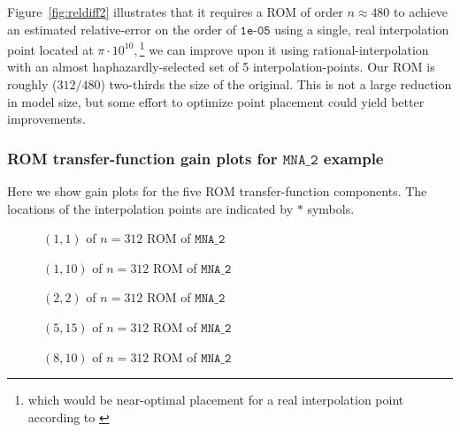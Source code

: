 Figure~\ref{fig:reldiff2} illustrates that it requires a ROM of order $n\approx480$ to achieve an estimated relative-error on the order of $\texttt{1e-05}$ using a single, real interpolation point located at $\pi\cdot 10^{10},
$\footnote{which would be near-optimal placement for a real interpolation point according to \cite{grimme97}} 
we can improve upon it using rational-interpolation with an almost haphazardly-selected set of 5 interpolation-points. Our ROM is roughly ($312/480$) two-thirds the size of the original.  This is not a large reduction in model size, but some effort to optimize point placement could yield better improvements.   
  
\clearpage
\subsubsection{ROM transfer-function gain plots for $\texttt{MNA\_2}$ example}
Here we show gain plots for the five ROM transfer-function components.  The locations of the interpolation points are indicated by $*$ symbols.
\begin{figure}[h]
\centering
{}

\caption{\label{fig:MNA2_1_1} $(1,1)$ of $n=312$ ROM of  $\texttt{MNA\_2}$}
\end{figure}

\begin{figure}
\centering
{}

\caption{\label{fig:MNA2_1_10} $(1,10)$ of $n=312$ ROM of  $\texttt{MNA\_2}$}
\end{figure}

\begin{figure}
\centering
{}

\caption{\label{fig:MNA2_2_2} $(2,2)$ of $n=312$ ROM of $\texttt{MNA\_2}$}
\end{figure}

\begin{figure}
\centering
{}

\caption{\label{fig:MNA2_5_15} $(5,15)$ of $n=312$ ROM of $\texttt{MNA\_2}$}
\end{figure}

\begin{figure}
\centering
{}

\caption{\label{fig:MNA2_8_10} $(8,10)$ of $n=312$ ROM of  $\texttt{MNA\_2}$}
\end{figure}

